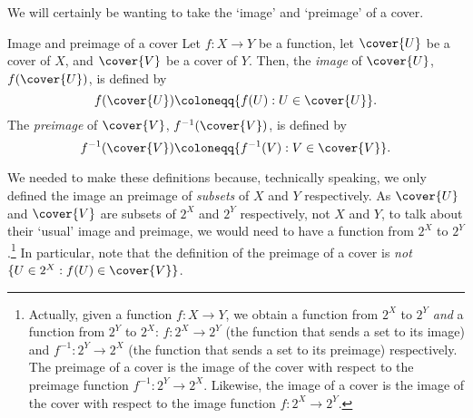 We will certainly be wanting to take the `image' and `preimage' of a cover.
\begin{dfn}{Image and preimage of a cover}{}
Let $f\colon X\rightarrow Y$ be a function, let $\cover{U}$ be a cover of $X$, and $\cover{V}$ be a cover of $Y$.  Then, the \emph{image} of $\cover{U}$, $f(\cover{U})$, is defined by
\begin{equation}
f(\cover{U})\coloneqq \{ f(U):U\in \cover{U}\} .
\end{equation}
The \emph{preimage} of $\cover{V}$, $f^{-1}(\cover{V})$, is defined by
\begin{equation}
f^{-1}(\cover{V})\coloneqq \{ f^{-1}(V):V\in \cover{V}\} .
\end{equation}
\begin{rmk}
We needed to make these definitions because, technically speaking, we only defined the image an preimage of \emph{subsets} of $X$ and $Y$ respectively.  As $\cover{U}$ and $\cover{V}$ are subsets of $2^X$ and $2^Y$ respectively, not $X$ and $Y$, to talk about their `usual' image and preimage, we would need to have a function from $2^X$ to $2^Y$.\footnote{Actually, given a function $f\colon X\rightarrow Y$, we obtain a function from $2^X$ to $2^Y$ \emph{and} a function from $2^Y$ to $2^X$:  $f\colon 2^X\rightarrow 2^Y$ (the function that sends a set to its image) and $f^{-1}:2^Y\rightarrow 2^X$ (the function that sends a set to its preimage) respectively.  The preimage of a cover is the image of the cover with respect to the preimage function $f^{-1}:2^Y\rightarrow 2^X$.  Likewise, the image of a cover is the image of the cover with respect to the image function $f\colon 2^X\rightarrow 2^Y$.}  In particular, note that the definition of the preimage of a cover is \emph{not} $\{ U\in 2^X:f(U)\in \cover{V}\}$.
\end{rmk}
\end{dfn}

